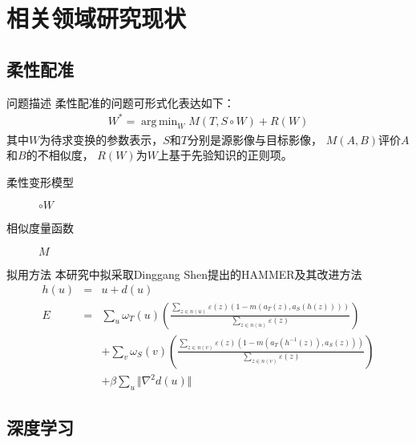 \documentclass {beamer}
\DeclareMathOperator*{\argmin}{arg\,min}
\begin{document}


\section{相关领域研究现状}

\subsection{柔性配准}

\begin{frame}{问题描述}
    柔性配准的问题可形式化表达如下\cite{sotiras2013deformable}：
    \begin{eqnarray*}
        W^* = \argmin_{W} M(T, S \circ W) + R(W)
    \end{eqnarray*}
    其中$W$为待求变换的参数表示，$S$和$T$分别是源影像与目标影像，
    $M(A, B)$评价$A$和$B$的不相似度，
    $R(W)$为$W$上基于先验知识的正则项。
    \begin{description}
        \item[柔性变形模型] $\circ W$
        \item[相似度量函数] $M$
    \end{description}
\end{frame}

\begin{frame}{拟用方法}
    本研究中拟采取Dinggang Shen提出的HAMMER及其改进方法
    \cite{shen2002hammer,shen2007image}
    \footnotesize
    \begin{eqnarray*}
        h(u) &=& u + d(u) \\
        E &=& \sum_{u}
        \omega_T(u)\left(\frac{
            \sum_{z\in n(u)}\varepsilon(z)(1-m(a_T(z), a_S(h(z))))}{
                \sum_{z\in n(u)}\varepsilon(z)}\right) \\
        & & + \sum_{v}\omega_S(v)\left(\frac{
            \sum_{z\in n(v)}\varepsilon(z)(1-m(a_T(h^{-1}(z)), a_S(z)))}{
                \sum_{z\in n(v)}\varepsilon(z)}\right) \\
        & & + \beta\sum_u\Vert\nabla^2d(u)\Vert
    \end{eqnarray*}
\end{frame}


\subsection{深度学习}
\end{document}
